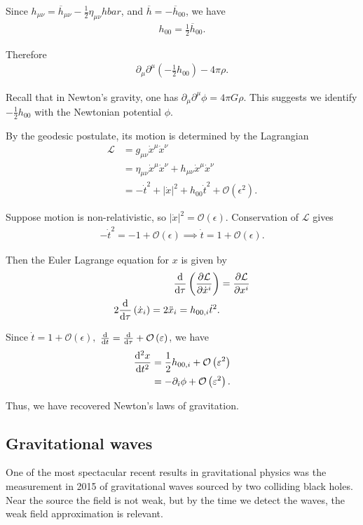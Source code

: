 Since $h_{\mu \nu} = \overline{h}_{\mu \nu}  -\frac{1}{2} \eta_{\mu \nu} hbar$, and $\overline{h} = -\overline{h}_{00}$, we have
\begin{align}
    h_{00} = \frac{1}{2} \overline{h}_{00}
.\end{align}

Therefore
\begin{align}
    \partial_\mu \partial^{\mu} \left( -\frac{1}{2} h_{00} \right) - 4 \pi \rho
.\end{align}

Recall that in Newton's gravity, one has $\partial_\mu \partial^{\mu} \phi = 4\pi G \rho$. This suggests we identify $-\frac{1}{2}h_{00}$ with the Newtonian potential $\phi$.

By the geodesic postulate, its motion is determined by the Lagrangian
\begin{align}
    \mathcal{L} &= g_{\mu \nu} \dot{x}^{\mu} \dot{x}^{\nu} \\
    &= \eta_{\mu \nu} \dot{x}^{\mu} \dot{x}^{\nu} + h_{\mu \nu} \dot{x}^{\mu} \dot{x}^{\nu} \\
    &= -\dot{t}^2 + \left| \dot{x} \right|^2 + h_{00} \dot{t}^2 + \mathcal{O}\left( \epsilon^2 \right) 
.\end{align}


Suppose motion is non-relativistic, so $\left| \dot{x} \right|^2 = \mathcal{O}\left( \epsilon \right)$. Conservation of $\mathcal{L}$ gives 
\begin{align}
    -\dot{t}^2 = -1 + \mathcal{O}\left( \epsilon \right) \implies \dot{t} = 1 + \mathcal{O}\left( \epsilon \right) 
.\end{align}

Then the Euler Lagrange equation for $x$ is given by
\begin{align}
    \dv{\tau} \left( \pdv{\mathcal{L}}{\dot{x}^{i}} \right) &= \pdv{\mathcal{L}}{x^{i}} \\
    2 \dv{\tau} \left( \dot{x}_i \right) = 2 \ddot{x}_{i} = h_{00,i} \dot{t}^2
.\end{align}

Since $\dot{t} = 1 + \mathcal{O}\left( \epsilon \right),$ $\dv{t} = \dv{\tau} + \mathcal{O}\left( \varepsilon \right) $, we have
\begin{align}
    \dv[2]{x}{t} &= \frac{1}{2} h_{00,i} + \mathcal{O}\left( \varepsilon^2 \right) \\
    &= -\partial_i \phi + \mathcal{O}\left( \varepsilon^2 \right) 
.\end{align}

Thus, we have recovered Newton's laws of gravitation.

\subsection{Gravitational waves}

One of the most spectacular recent results in gravitational physics was the measurement in 2015 of gravitational waves sourced by two colliding black holes. Near the source the field is not weak, but by the time we detect the waves, the weak field approximation is relevant.


